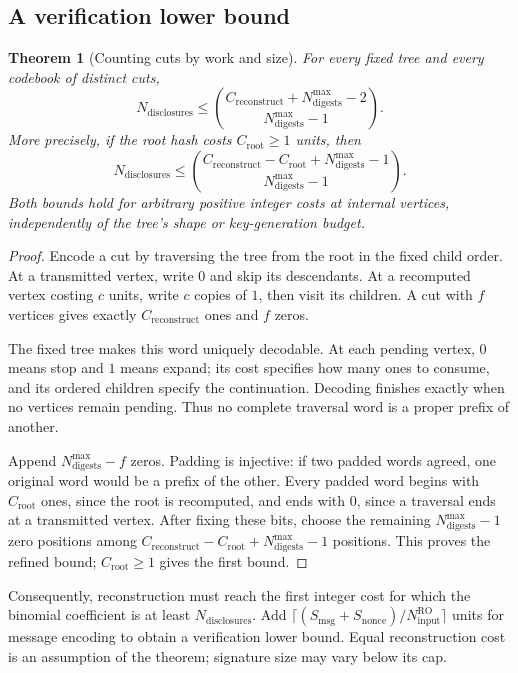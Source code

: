 \documentclass[10pt]{article}
\newtheorem{theorem}[proposition]{Theorem}
\newcommand{\roinput}{N_{\mathrm{input}}^{\mathrm{RO}}}
\newcommand{\messagesize}{S_{\mathrm{msg}}}
\newcommand{\noncesize}{S_{\mathrm{nonce}}}
\newcommand{\disclosurecount}{N_{\mathrm{disclosures}}}
\newcommand{\digestbudget}{N_{\mathrm{digests}}^{\max}}
\newcommand{\reconstructcost}{C_{\mathrm{reconstruct}}}
\begin{document}
\subsection{A verification lower bound}
\begin{theorem}[Counting cuts by work and size]\label{thm:tree-verification}
For every fixed tree and every codebook of distinct cuts,
\[
 \boxed{\displaystyle \disclosurecount\le\binom{\reconstructcost+\digestbudget-2}{\digestbudget-1}.}
\]
More precisely, if the root hash costs $C_{\mathrm{root}}\ge1$ units, then
\[
 \disclosurecount\le\binom{\reconstructcost-C_{\mathrm{root}}+\digestbudget-1}{\digestbudget-1}.
\]
Both bounds hold for arbitrary positive integer costs at internal vertices, independently of the tree's shape or key-generation budget.
\end{theorem}
\begin{proof}
Encode a cut by traversing the tree from the root in the fixed child order. At a transmitted vertex, write $0$ and skip its descendants. At a recomputed vertex costing $c$ units, write $c$ copies of $1$, then visit its children. A cut with $f$ vertices gives exactly $\reconstructcost$ ones and $f$ zeros.

The fixed tree makes this word uniquely decodable. At each pending vertex, $0$ means stop and $1$ means expand; its cost specifies how many ones to consume, and its ordered children specify the continuation. Decoding finishes exactly when no vertices remain pending. Thus no complete traversal word is a proper prefix of another.

Append $\digestbudget-f$ zeros. Padding is injective: if two padded words agreed, one original word would be a prefix of the other. Every padded word begins with $C_{\mathrm{root}}$ ones, since the root is recomputed, and ends with $0$, since a traversal ends at a transmitted vertex. After fixing these bits, choose the remaining $\digestbudget-1$ zero positions among $\reconstructcost-C_{\mathrm{root}}+\digestbudget-1$ positions. This proves the refined bound; $C_{\mathrm{root}}\ge1$ gives the first bound.
\end{proof}
Consequently, reconstruction must reach the first integer cost for which the binomial coefficient is at least $\disclosurecount$. Add $\lceil(\messagesize+\noncesize)/\roinput\rceil$ units for message encoding to obtain a verification lower bound. Equal reconstruction cost is an assumption of the theorem; signature size may vary below its cap.
\end{document}
